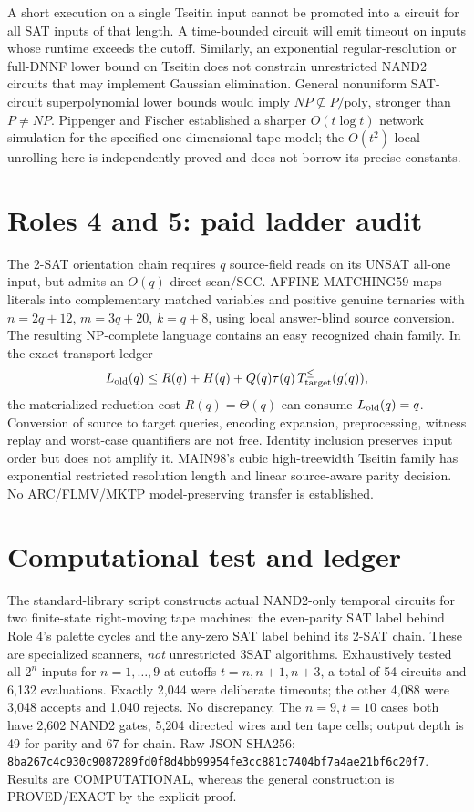 \documentclass[10pt]{article}
\begin{document}
A short execution on a single Tseitin input cannot be promoted into a circuit for all SAT inputs of that length. A time-bounded circuit will emit timeout on inputs whose runtime exceeds the cutoff. Similarly, an exponential regular-resolution or full-DNNF lower bound on Tseitin does not constrain unrestricted NAND2 circuits that may implement Gaussian elimination. General nonuniform SAT-circuit superpolynomial lower bounds would imply $NP\not\subseteq P/\mathrm{poly}$, stronger than $P\ne NP$. Pippenger and Fischer established a sharper $O(t\log t)$ network simulation for the specified one-dimensional-tape model; the $O(t^2)$ local unrolling here is independently proved and does not borrow its precise constants.

\section{Roles 4 and 5: paid ladder audit}
The 2-SAT orientation chain requires $q$ source-field reads on its UNSAT all-one input, but admits an $O(q)$ direct scan/SCC. AFFINE-MATCHING59 maps literals into complementary matched variables and positive genuine ternaries with $n=2q+12$, $m=3q+20$, $k=q+8$, using local answer-blind source conversion. The resulting NP-complete language contains an easy recognized chain family. In the exact transport ledger
\[
L_{\rm old}(q)\le R(q)+H(q)+Q(q)\tau(q)\,T_{\rm target}^{\le}(g(q)),
\]
the materialized reduction cost $R(q)=\Theta(q)$ can consume $L_{\rm old}(q)=q$. Conversion of source to target queries, encoding expansion, preprocessing, witness replay and worst-case quantifiers are not free. Identity inclusion preserves input order but does not amplify it. MAIN98's cubic high-treewidth Tseitin family has exponential restricted resolution length and linear source-aware parity decision. No ARC/FLMV/MKTP model-preserving transfer is established.

\section{Computational test and ledger}
The standard-library script constructs actual NAND2-only temporal circuits for two finite-state right-moving tape machines: the even-parity SAT label behind Role 4's palette cycles and the any-zero SAT label behind its 2-SAT chain. These are specialized scanners, \emph{not} unrestricted 3SAT algorithms. Exhaustively tested all $2^n$ inputs for $n=1,\ldots,9$ at cutoffs $t=n,n+1,n+3$, a total of 54 circuits and 6,132 evaluations. Exactly 2,044 were deliberate timeouts; the other 4,088 were 3,048 accepts and 1,040 rejects. No discrepancy. The $n=9,t=10$ cases both have 2,602 NAND2 gates, 5,204 directed wires and ten tape cells; output depth is 49 for parity and 67 for chain. Raw JSON SHA256: \texttt{8ba267c4c930c9087289fd0f8d4bb99954fe3cc881c7404bf7a4ae21bf6c20f7}. Results are COMPUTATIONAL, whereas the general construction is PROVED/EXACT by the explicit proof.
\end{document}
